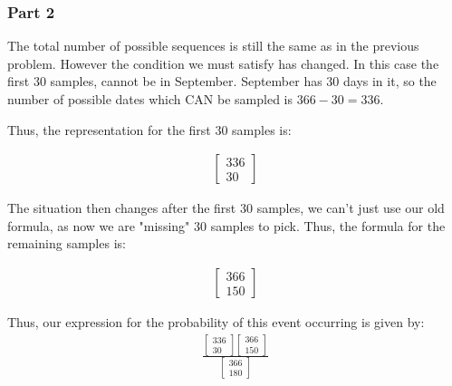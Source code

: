 \documentclass{article}
\begin{document}
\subsubsection*{Part 2}

The total number of possible sequences is still the same as in the previous problem. However the condition we must satisfy has changed. In this case the first 30 samples, cannot be in September. September has 30 days in it, so the number of possible dates which CAN be sampled is $366-30 = 336$.

Thus, the representation for the first 30 samples is:

\begin{align*}
\begin{bmatrix}
336 \\
30
\end{bmatrix}
\end{align*}

The situation then changes after the first 30 samples, we can't just use our old formula, as now we are "missing" 30 samples to pick. Thus, the formula for the remaining samples is:

\begin{align*}
\begin{bmatrix}
366 \\
150
\end{bmatrix}
\end{align*}

Thus, our expression for the probability of this event occurring is given by:
\begin{align*}
      \boxed{\frac{\begin{bmatrix}
336 \\
30
\end{bmatrix}\begin{bmatrix}
366 \\
150
\end{bmatrix}}{\begin{bmatrix}
366 \\
180
\end{bmatrix}}}
\end{align*}
\end{document}
